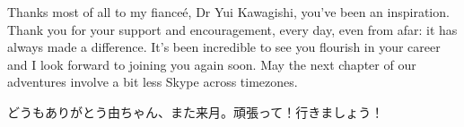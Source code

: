 Thanks most of all to my fiance\'{e}, Dr Yui Kawagishi, you've been an inspiration. Thank you for your support and encouragement, every day, even from afar: it has always made a difference. It’s been incredible to see you flourish in your career and I look forward to joining you again soon. May the next chapter of our adventures involve a bit less Skype across timezones.

\begin{CJK}{UTF8}{goth}どうもありがとう由ちゃん、また来月。頑張って！行きましょう！\end{CJK}